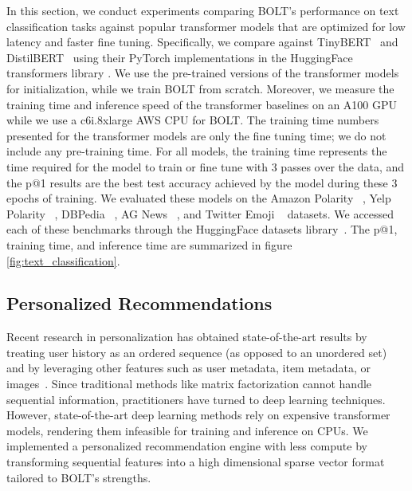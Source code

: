 \documentclass[sigconf]{acmart}
\begin{document}
In this section, we conduct experiments comparing BOLT's performance on text classification tasks against popular transformer models \cite{vaswani2017attention} that are optimized for low latency and faster fine tuning. Specifically, we compare against TinyBERT~\cite{turc2019well} and DistilBERT~\cite{sanh2019distilbert} using their PyTorch implementations in the HuggingFace transformers library \cite{wolf2019huggingface}. We use the pre-trained versions of the transformer models for initialization, while we train BOLT from scratch. Moreover, we measure the training time and inference speed of the transformer baselines on an A100 GPU while we use a c6i.8xlarge AWS CPU for BOLT. The training time numbers presented for the transformer models are only the fine tuning time; we do not include any pre-training time. For all models, the training time represents the time required for the model to train or fine tune with 3 passes over the data, and the p@1 results are the best test accuracy achieved by the model during these 3 epochs of training. We evaluated these models on the Amazon Polarity ~\cite{zhangCharacterlevelConvolutionalNetworks2015, mcauley2013hidden}, Yelp Polarity ~\cite{zhangCharacterlevelConvolutionalNetworks2015}, DBPedia ~\cite{zhangCharacterlevelConvolutionalNetworks2015, lehmann2015dbpedia}, AG News ~\cite{zhangCharacterlevelConvolutionalNetworks2015}, and Twitter Emoji ~\cite{barbieri2020tweeteval} datasets. We accessed each of these benchmarks through the HuggingFace datasets library~\cite{lhoest2021datasets}. The p@1, training time, and inference time are summarized in figure \ref{fig:text_classification}.


















 



\subsection{Personalized Recommendations}



Recent research in personalization has obtained state-of-the-art results by treating user history as an ordered sequence (as opposed to an unordered set) and by leveraging other features such as user metadata, item metadata, or images~\cite{sasrec, sun2019bert4rec, Rashed_2022}. Since traditional methods like matrix factorization cannot handle sequential information, practitioners have turned to deep learning techniques. However, state-of-the-art deep learning methods rely on expensive transformer models, rendering them infeasible for training and inference on CPUs. We implemented a personalized recommendation engine with less compute by transforming sequential features into a high dimensional sparse vector format tailored to BOLT’s strengths.
\end{document}

